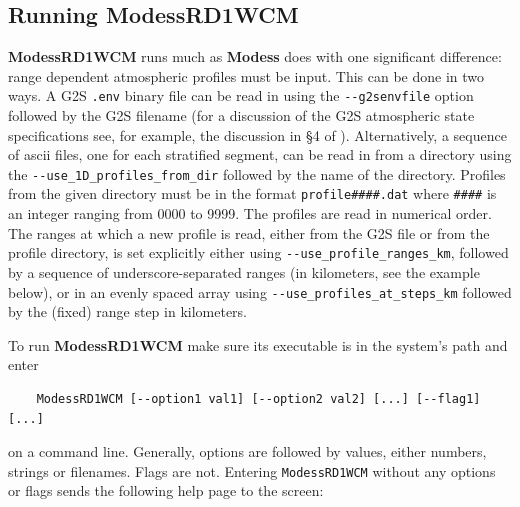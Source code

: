 \subsection{Running ModessRD1WCM}
\label{sec: running rdmodess}

{\bf ModessRD1WCM} runs much as {\bf Modess} does with one significant difference: range dependent atmospheric profiles must be input. This can be done in two ways. A G2S \verb+.env+ binary file can be read in using the \verb+--g2senvfile+ option followed by the G2S filename (for a discussion of the G2S atmospheric state specifications see, for example, the discussion in \S 4 of \cite{non-lin_therm}). Alternatively, a sequence of ascii files, one for each stratified segment, can be read in from a directory using the \verb+--use_1D_profiles_from_dir+ followed by the name of the directory. Profiles from the given directory must be in the format \verb+profile####.dat+ where \verb+####+ is an integer ranging from 0000 to 9999. The profiles are read in numerical order. The ranges at which a new profile is read, either from the G2S file or from the profile directory, is set explicitly either using \verb+--use_profile_ranges_km+, followed by a sequence of underscore-separated ranges (in kilometers, see the example below), or in an evenly spaced array using \verb+--use_profiles_at_steps_km+ followed by the (fixed) range step in kilometers. 

To run {\bf ModessRD1WCM} make sure its executable is in the system's path and enter 
\begin{verbatim} 
    ModessRD1WCM [--option1 val1] [--option2 val2] [...] [--flag1] [...] 
\end{verbatim}
on a command line. Generally, options are followed by values, either numbers, strings or filenames. Flags are not. Entering \verb"ModessRD1WCM" without any options or flags sends the following help page to the screen: 

